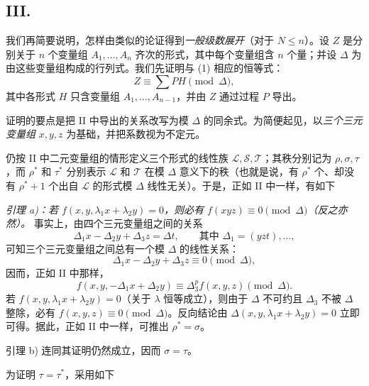 \documentclass[11pt]{article}
\begin{document}
\subsection*{III.}
我们再简要说明，怎样由类似的论证得到\emph{一般级数展开}（对于 $N\le n$）。设 $Z$ 是分别关于 $n$ 个变量组 $A_1,
\ldots,A_n$ 齐次的形式，其中每个变量组含 $n$ 个量；并设 $\Delta$ 为由这些变量组构成的行列式。我们先证明与 (1) 相应的恒等式：
\begin{equation}
  Z\equiv\sum PH \pmod{\Delta},
\tag{2}
\end{equation}
其中各形式 $H$ 只含变量组 $A_1,\ldots,A_{n-1}$，并由 $Z$ 通过过程 $P$ 导出。

证明的要点是把 II 中导出的关系改写为模 $\Delta$ 的同余式。为简便起见，以\emph{三个三元变量组} $x,y,z$ 为基础，并把系数视为不定元。

仍按 II 中二元变量组的情形定义三个形式的线性族 $\mathcal L,\mathcal S,\mathcal T$；其秩分别记为 $\rho,\sigma,\tau$，而 $\rho^*$ 和 $\tau^*$ 分别表示 $\mathcal L$ 和 $\mathcal T$ 在模 $\Delta$ 意义下的秩（也就是说，有 $\rho^*$ 个、却没有 $\rho^*+1$ 个出自 $\mathcal L$ 的形式模 $\Delta$ 线性无关）。于是，正如 II 中一样，有如下

\emph{引理 a)：若 $f(x,y,\lambda_1x+\lambda_2y)=0$，则必有 $f(xyz)\equiv0\pmod{\Delta}$（反之亦然）。} 事实上，由四个三元变量组之间的关系
\[
  \Delta_1x-\Delta_2y+\Delta_3z=\Delta t,
  \qquad \text{其中 }\Delta_1=(yzt),\ldots,
\]
可知三个三元变量组之间总有一个模 $\Delta$ 的线性关系：
\[
  \Delta_1x-\Delta_2y+\Delta_3z\equiv0\pmod{\Delta},
\]
因而，正如 II 中那样，
\[
  f(x,y,-\Delta_1x+\Delta_2y)\equiv\Delta_3^p f(x,y,z)\pmod{\Delta}.
\]
若 $f(x,y,\lambda_1x+\lambda_2y)=0$（关于 $\lambda$ 恒等成立），则由于 $\Delta$ 不可约且 $\Delta_3$ 不被 $\Delta$ 整除，必有 $f(x,y,z)\equiv0\pmod{\Delta}$。反向结论由 $\Delta(x,y,\lambda_1x+\lambda_2y)=0$ 立即可得。据此，正如 II 中一样，可推出 $\rho^*=\sigma$。

引理 b) 连同其证明仍然成立，因而 $\sigma=\tau$。

为证明 $\tau=\tau^*$，采用如下
\end{document}
